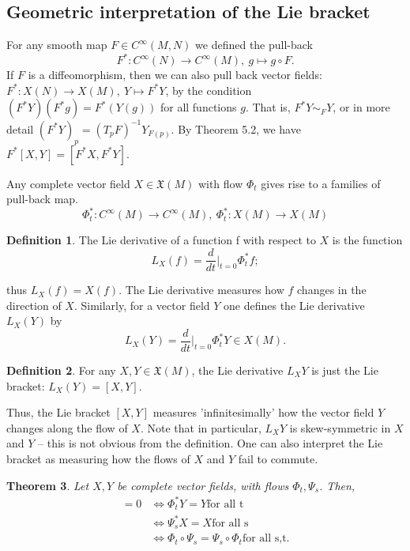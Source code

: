 \documentclass{article}
\newtheorem{theorem}{Theorem}[section]
\theoremstyle{definition}
\newtheorem{defn}[theorem]{Definition}
\newenvironment{definition}
  {\vspace{8pt}\begin{mdframed}[backgroundcolor=blueish,innertopmargin=4]\begin{defn}}
  {\end{defn}\end{mdframed}\vspace{4pt}}
\begin{document}
\subsection{Geometric interpretation of the Lie bracket}

For any smooth map $F \in C^\infty(M,N)$ we defined the pull-back
\[
    F^* : C ^\infty (N) \rightarrow C ^\infty (M), \ g \mapsto g \circ F.
\]
If $F$ is a diffeomorphism, then we can also pull back vector fields: $F^* : X(N) \rightarrow X(M), \ Y \mapsto F^*Y$, by the condition $(F^*Y)(F^* g) = F^* (Y(g))$ for all functions $g$. That is, $F^* Y \sim_F Y$, or in more detail $(F^*Y)_p = (T_pF)^{ -1}Y_{F(p)}$. By Theorem 5.2, we have $F^*[X,Y] = [F^*X,F^*Y]$.


Any complete vector field $X \in \mathfrak X(M)$ with flow $\Phi_t$ gives rise to a families of pull-back map.
\[
    \Phi^*_t : C ^\infty (M) \rightarrow C^\infty (M), \  \Phi^*_t : X(M) \rightarrow X(M)
\]

\begin{definition}
The Lie derivative of a function f with respect to $X$ is the function
\[
    L_X (f) = \frac{d}{dt} \Bigr |_{t=0} \Phi^*_t f ;
\]

thus $L_X (f) = X(f)$. The Lie derivative measures how $f$ changes in the direction of $X$. Similarly, for a vector field $Y$ one defines the Lie derivative  $L_X (Y)$ by
\[
   L_X (Y) = \frac{d} {dt}\Bigr |_{t=0} \Phi^*_t Y \in X(M).
\]
\end{definition}

\begin{definition}
For any $X,Y \in \mathfrak X(M)$, the Lie derivative $L_X Y$ is just the Lie bracket: $L_X (Y) = [X,Y]$.
\end{definition}

Thus, the Lie bracket $[X,Y]$ measures 'infinitesimally' how the vector field $Y$ changes along the flow of $X$. Note that in particular, $L_XY$ is skew-symmetric in $X$ and $Y$ – this is not obvious from the definition. One can also interpret the Lie bracket as measuring how the flows of $X$ and $Y$ fail to commute.

\begin{theorem}
Let $X,Y$ be complete vector fields, with flows $\Phi_t ,\Psi_s$. Then,
\begin{align*}
    [X,Y] = 0 &\iff \Phi^*_t Y = Y \text{for all t}\\
    &\iff \Psi^*_s X = X \text{for all s} \\
    &\iff  \Phi_t \circ \Psi_s  = \Psi_s \circ \Phi_t \text{for all s,t.}
\end{align*}

\end{theorem}
\end{document}
